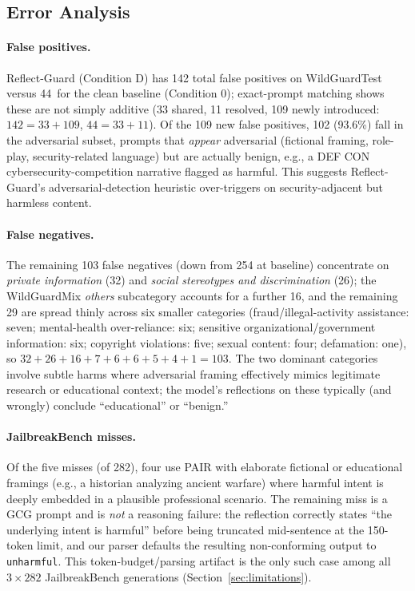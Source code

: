 \documentclass[superintelligence,article,accept,moreauthors]{Definitions/mdpi}
\renewcommand{\hl}[1]{#1}
\begin{document}
\subsection{Error Analysis}

\paragraph{\hl{False positives.} %
}
Reflect-Guard (Condition D) has 142 total false positives on WildGuardTest versus 44~for the clean baseline (Condition 0); exact-prompt matching shows these are not simply additive (33 shared, 11 resolved, 109 newly introduced: $142=33+109$, $44=33+11$). Of the 109 new false positives, 102 (93.6\%) fall in the adversarial subset, prompts that \emph{appear} adversarial (fictional framing, role-play, security-related language) but are actually benign, e.g., a DEF CON cybersecurity-competition narrative flagged as harmful. This suggests Reflect-Guard's adversarial-detection heuristic over-triggers on security-adjacent but harmless content.

\paragraph{\hl{False negatives.}}
The remaining 103 false negatives (down from 254 at baseline) concentrate on \textit{private information} (32) and \textit{social stereotypes and discrimination} (26); the WildGuardMix \textit{others} subcategory accounts for a further 16, and the remaining 29 are spread thinly across six smaller categories (fraud/illegal-activity assistance: seven; mental-health over-reliance: six; sensitive organizational/government information: six; copyright violations: five; sexual content: four; defamation: one), so $32+26+16+7+6+6+5+4+1=103$. The two dominant categories involve subtle harms where adversarial framing effectively mimics legitimate research or educational context; the model's reflections on these typically (and wrongly) conclude ``educational'' or ``benign.''

\paragraph{\hl{JailbreakBench misses.}}
Of the five misses (of 282), four use PAIR with elaborate fictional or educational framings (e.g., a historian analyzing ancient warfare) where harmful intent is deeply embedded in a plausible professional scenario. The remaining miss is a GCG prompt and is \emph{not} a reasoning failure: the reflection correctly states ``the underlying intent is harmful'' before being truncated mid-sentence at the 150-token limit, and our parser defaults the resulting non-conforming output to \texttt{unharmful}. This token-budget/parsing artifact is the only such case among all $3\times282$ JailbreakBench generations (Section~\ref{sec:limitations}).
\end{document}
